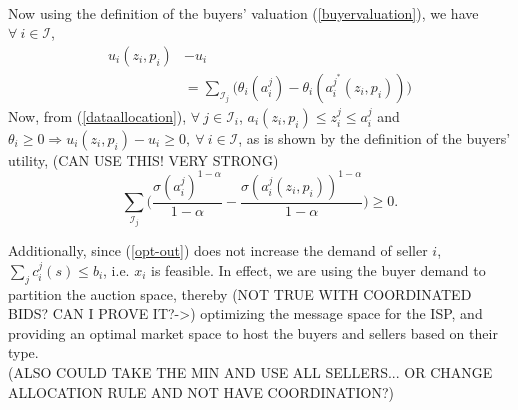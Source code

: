 \documentclass[12pt]{article}
\theoremstyle{definition}
\newcommand{\mcI}{\mathcal{I}}
\begin{document}
\begin{multicols}{2}
\begin{align*}
\end{align*}
Now using the definition of
the buyers' valuation (\ref{buyervaluation}), we have $\forall \ i \in\mcI$,
\begin{align*}
    u_i(z_i,p_i) &- u_i \\
    &=\displaystyle\sum_{\mcI_j}\bigg(\theta_i(a_i^j)-
\theta_i(a_i^{j^*}(z_i,p_i))\bigg) 
\end{align*}
Now, from (\ref{dataallocation}), $\forall \ j\in\mcI_i$, $a_i(z_i,p_i) \le
z_i^j \le a_i^j$ and $\theta_i\ge 0 \Rightarrow u_i(z_i,p_i) - u_i \ge 0,
\ \forall \ i\in \mcI$, as is shown by the definition of the buyers' utility,
(CAN USE THIS! VERY STRONG)
$$
     \sum_{\mcI_j}\bigg(\frac{\sigma (a_i^j)^{1-\alpha}}{1-\alpha}
-\frac{\sigma (a_i^j(z_i,p_i))^{1-\alpha}}{1-\alpha}\bigg)
     \ge 0.
$$

Additionally, since (\ref{opt-out}) does
not increase the demand of seller $i$, $\sum_j c_i^j(s) \le b_i$, i.e. $x_i$ is feasible.
In effect, we are using the buyer demand
to partition the auction space, thereby (NOT TRUE WITH COORDINATED BIDS? CAN I
PROVE IT?->) optimizing the message space for the
ISP, and providing an optimal market space to host the buyers and sellers based
on their type. \\
(ALSO COULD TAKE THE MIN AND USE ALL SELLERS... OR CHANGE ALLOCATION RULE AND
NOT HAVE COORDINATION?)


\end{multicols}
\end{document}
